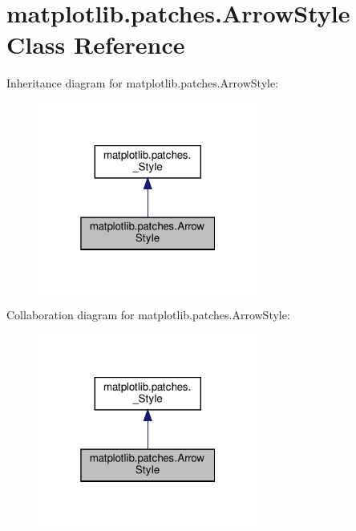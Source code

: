 \hypertarget{classmatplotlib_1_1patches_1_1ArrowStyle}{}\section{matplotlib.\+patches.\+Arrow\+Style Class Reference}
\label{classmatplotlib_1_1patches_1_1ArrowStyle}


Inheritance diagram for matplotlib.\+patches.\+Arrow\+Style\+:
\nopagebreak
\begin{figure}[H]
\begin{center}
\leavevmode
\includegraphics[width=205pt]{classmatplotlib_1_1patches_1_1ArrowStyle__inherit__graph}
\end{center}
\end{figure}


Collaboration diagram for matplotlib.\+patches.\+Arrow\+Style\+:
\nopagebreak
\begin{figure}[H]
\begin{center}
\leavevmode
\includegraphics[width=205pt]{classmatplotlib_1_1patches_1_1ArrowStyle__coll__graph}
\end{center}
\end{figure}
